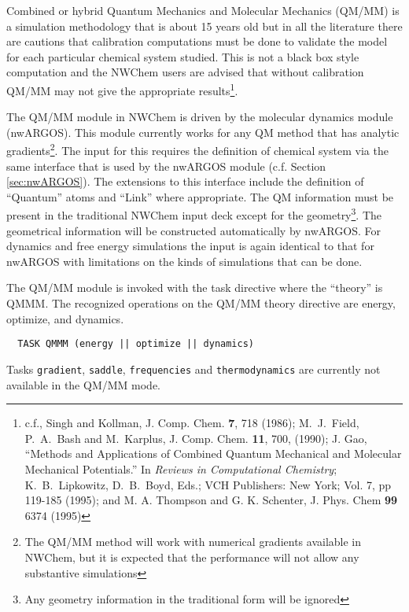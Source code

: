 
\label{sec:qmmm}

Combined or hybrid Quantum Mechanics and Molecular Mechanics (QM/MM)
is a simulation methodology that is about 15 years old but in all the
literature there are cautions that calibration computations must be
done to validate the model for each particular chemical system
studied.  This is not a black box style computation and the NWChem
users are advised that without calibration QM/MM may not give the
appropriate results\footnote{c.f., Singh and Kollman, J. Comp. Chem.
  {\bf 7}, 718 (1986); M.~J.~Field, P.~A.~Bash and M.~Karplus, J.
  Comp. Chem. {\bf 11}, 700, (1990); J. Gao, ``Methods and
  Applications of Combined Quantum Mechanical and Molecular Mechanical
  Potentials.'' In {\it Reviews in Computational Chemistry};
  K.~B.~Lipkowitz, D.~B.~Boyd, Eds.; VCH Publishers: New York;
  Vol. 7, pp 119-185 (1995); and M. A. Thompson and G. K. Schenter, J.
  Phys. Chem {\bf 99} 6374 (1995) }.

The QM/MM module in NWChem is driven by the molecular dynamics module
(nwARGOS).  This module currently works for any QM method that has
analytic gradients\footnote{The QM/MM method will work with numerical
  gradients available in NWChem, but it is expected that the
  performance will not allow any substantive simulations}.  The input
for this requires the definition of chemical system via the same
interface that is used by the nwARGOS module (c.f. Section
\ref{sec:nwARGOS}).  The extensions to this interface include the
definition of ``Quantum'' atoms and ``Link'' where appropriate.  The
QM information must be present in the traditional NWChem input deck
except for the geometry\footnote{Any geometry information in the
  traditional form will be ignored}.  The geometrical information will
be constructed automatically by nwARGOS.  For dynamics and free energy
simulations the input is again identical to that for nwARGOS with
limitations on the kinds of simulations that can be done.

The QM/MM module is invoked with the task directive where the
``theory'' is QMMM.  The recognized operations on the QM/MM theory
directive are energy, optimize, and dynamics.

\begin{verbatim}
  TASK QMMM (energy || optimize || dynamics)
\end{verbatim}

Tasks \verb+gradient+, \verb+saddle+, \verb+frequencies+ and
\verb+thermodynamics+ are currently not available in the QM/MM mode.  



